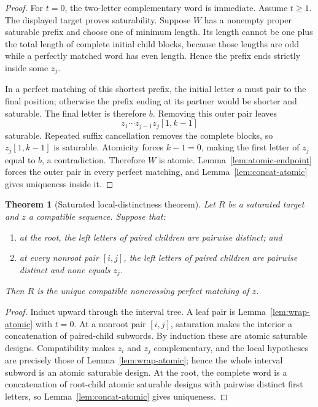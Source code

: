 \documentclass[11pt]{article}
\newtheorem{theorem}{Theorem}[section]
\begin{document}
\begin{proof}
For $t=0$, the two-letter complementary word is immediate.  Assume $t\ge1$.  The displayed target proves saturability.  Suppose $W$ has a nonempty proper saturable prefix and choose one of minimum length.  Its length cannot be one plus the total length of complete initial child blocks, because those lengths are odd while a perfectly matched word has even length.  Hence the prefix ends strictly inside some $z_j$.

In a perfect matching of this shortest prefix, the initial letter $a$ must pair to the final position; otherwise the prefix ending at its partner would be shorter and saturable.  The final letter is therefore $b$.  Removing this outer pair leaves
\[
z_1\cdots z_{j-1}z_j[1,k-1]
\]
saturable.  Repeated suffix cancellation removes the complete blocks, so $z_j[1,k-1]$ is saturable.  Atomicity forces $k-1=0$, making the first letter of $z_j$ equal to $b$, a contradiction.  Therefore $W$ is atomic.  Lemma~\ref{lem:atomic-endpoint} forces the outer pair in every perfect matching, and Lemma~\ref{lem:concat-atomic} gives uniqueness inside it.
\end{proof}

\begin{theorem}[Saturated local-distinctness theorem]
\label{thm:saturated-unique}
Let $R$ be a saturated target and $z$ a compatible sequence.  Suppose that:
\begin{enumerate}
\item at the root, the left letters of paired children are pairwise distinct; and
\item at every nonroot pair $[i,j]$, the left letters of paired children are pairwise distinct and none equals $z_j$.
\end{enumerate}
Then $R$ is the unique compatible noncrossing perfect matching of $z$.
\end{theorem}

\begin{proof}
Induct upward through the interval tree.  A leaf pair is Lemma~\ref{lem:wrap-atomic} with $t=0$.  At a nonroot pair $[i,j]$, saturation makes the interior a concatenation of paired-child subwords.  By induction these are atomic saturable designs.  Compatibility makes $z_i$ and $z_j$ complementary, and the local hypotheses are precisely those of Lemma~\ref{lem:wrap-atomic}; hence the whole interval subword is an atomic saturable design.  At the root, the complete word is a concatenation of root-child atomic saturable designs with pairwise distinct first letters, so Lemma~\ref{lem:concat-atomic} gives uniqueness.
\end{proof}
\end{document}
